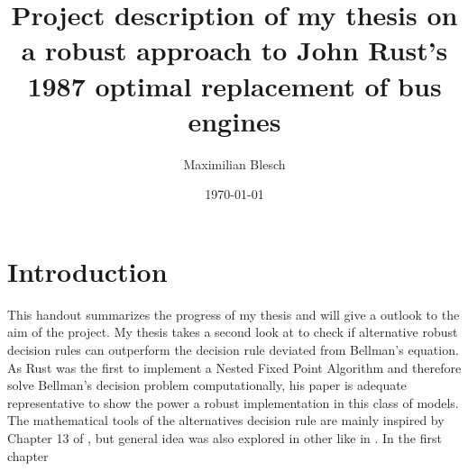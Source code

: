 \documentclass[a4paper,12pt,bold]{scrartcl}
\title{Project description of my thesis on a robust approach to John Rust's 1987 optimal replacement of bus engines}
\author{Maximilian Blesch}
\date{\today}
\begin{document}
\maketitle
\newpage
\tableofcontents
\newpage
\section{Introduction}
This handout summarizes the progress of my thesis and will give a outlook to the aim of the project.
My thesis takes a second look at \cite{Rust.1987} to check if alternative robust decision rules can outperform the decision rule deviated from Bellman's equation.
As Rust was the first to implement a Nested Fixed Point Algorithm and therefore solve Bellman's decision problem computationally, his paper is adequate representative
to show the power a robust implementation in this class of models.
The mathematical tools of the alternatives decision rule are mainly inspired by Chapter 13 of \cite{Ben-Tal.2009}, but general idea was also explored in other
like in \cite{Kaufman.2017}. In the first chapter
\end{document}
